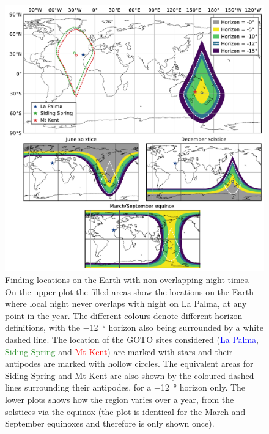 \begin{colsection}
\begin{colsection}
\begin{figure}[p]
    \begin{center}
        \includegraphics[width=\linewidth]{images/sites.pdf}
    \end{center}

    \caption[Locations on the Earth with non-overlapping night times]{
        Finding locations on the Earth with non-overlapping night times. On the upper plot the filled areas show the locations on the Earth where local night never overlaps with night on La Palma, at any point in the year. The different colours denote different horizon definitions, with the \SI{-12}{\degree} horizon also being surrounded by a white dashed line. The location of the GOTO sites considered (\textcolor{blue}{La Palma}, \textcolor{ForestGreen}{Siding Spring} and \textcolor{red}{Mt Kent}) are marked with stars and their antipodes are marked with hollow circles. The equivalent areas for Siding Spring and Mt Kent are also shown by the coloured dashed lines surrounding their antipodes, for a \SI{-12}{\degree} horizon only. The lower plots shows how the region varies over a year, from the solstices via the equinox (the plot is identical for the March and September equinoxes and therefore is only shown once).
    }\label{fig:site_nights}
\end{figure}


\end{colsection}
\end{colsection}
